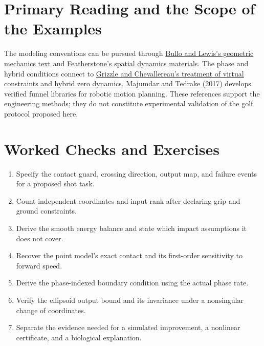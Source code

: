 \begin{samepage}
\section{Primary Reading and the Scope of the Examples}

The modeling conventions can be pursued through \href{https://motion.me.ucsb.edu/book-gcms/}{Bullo and Lewis's geometric mechanics text} and \href{https://royfeatherstone.org/teaching/index.html}{Featherstone's spatial dynamics materials}. The phase and hybrid conditions connect to \href{https://grizzle.robotics.umich.edu/files/HZD_HandbookApril2015.pdf}{Grizzle and Chevallereau's treatment of virtual constraints and hybrid zero dynamics}. \href{https://doi.org/10.1177/0278364917712421}{Majumdar and Tedrake (2017)} develops verified funnel libraries for robotic motion planning. These references support the engineering methods; they do not constitute experimental validation of the golf protocol proposed here.

\section{Worked Checks and Exercises}

\begin{enumerate}[itemsep=0.25em,parsep=0pt]
\item Specify the contact guard, crossing direction, output map, and failure events for a proposed shot task.
\item Count independent coordinates and input rank after declaring grip and ground constraints.
\item Derive the smooth energy balance and state which impact assumptions it does not cover.
\item Recover the point model's exact contact and its first-order sensitivity to forward speed.
\item Derive the phase-indexed boundary condition using the actual phase rate.
\item Verify the ellipsoid output bound and its invariance under a nonsingular change of coordinates.
\item Separate the evidence needed for a simulated improvement, a nonlinear certificate, and a biological explanation.
\end{enumerate}
\end{samepage}
\clearpage
\endgroup
